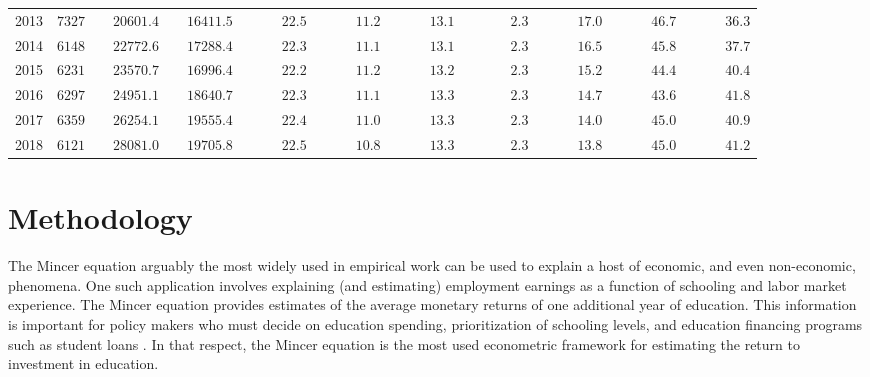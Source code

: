 \documentclass[alpha-refs]{wiley-article-01g}
\begin{document}
\begin{table}[htbp!]
{\begin{tabular}{lcccccccccc}
			2013  & $7327$ & $\phantom{00}20601.4$ & $\phantom{00}16411.5$ & $\phantom{00000}22.5$ & $\phantom{00000}11.2$ & $\phantom{00000}13.1$ & $\phantom{000000}2.3$ & $\phantom{00000}17.0$ & $\phantom{00000}46.7$ & $\phantom{00000}36.3$ \\
			2014  & $6148$ & $\phantom{00}22772.6$ & $\phantom{00}17288.4$ & $\phantom{00000}22.3$ & $\phantom{00000}11.1$ & $\phantom{00000}13.1$ & $\phantom{000000}2.3$ & $\phantom{00000}16.5$ & $\phantom{00000}45.8$ & $\phantom{00000}37.7$ \\
			2015  & $6231$ & $\phantom{00}23570.7$ & $\phantom{00}16996.4$ & $\phantom{00000}22.2$ & $\phantom{00000}11.2$ & $\phantom{00000}13.2$ & $\phantom{000000}2.3$ & $\phantom{00000}15.2$ & $\phantom{00000}44.4$ & $\phantom{00000}40.4$ \\
			2016  & $6297$ & $\phantom{00}24951.1$ & $\phantom{00}18640.7$ & $\phantom{00000}22.3$ & $\phantom{00000}11.1$ & $\phantom{00000}13.3$ & $\phantom{000000}2.3$ & $\phantom{00000}14.7$ & $\phantom{00000}43.6$ & $\phantom{00000}41.8$ \\
			2017  & $6359$ & $\phantom{00}26254.1$ & $\phantom{00}19555.4$ & $\phantom{00000}22.4$ & $\phantom{00000}11.0$ & $\phantom{00000}13.3$ & $\phantom{000000}2.3$ & $\phantom{00000}14.0$ & $\phantom{00000}45.0$ & $\phantom{00000}40.9$ \\
			2018  & $6121$ & $\phantom{00}28081.0$ & $\phantom{00}19705.8$ & $\phantom{00000}22.5$ & $\phantom{00000}10.8$ & $\phantom{00000}13.3$ & $\phantom{000000}2.3$ & $\phantom{00000}13.8$ & $\phantom{00000}45.0$ & $\phantom{00000}41.2$ \\
			\hline 
		\end{tabular}
	}
\end{table}

\section{Methodology}

The Mincer equation \textendash arguably the most widely used in empirical work \textendash can be used to explain a host of economic, and even non-economic, phenomena. One such application involves explaining (and estimating) employment earnings as a function of schooling and labor market experience. The Mincer equation provides estimates of the average monetary returns of one additional year of education. This information is important for policy makers who must decide on education spending, prioritization of schooling levels, and education financing programs such as student loans \parencite{Patrinos2016}. In that respect, the Mincer equation is the most used econometric framework for estimating the return to investment in education.
\end{document}
